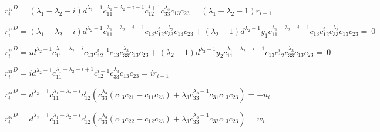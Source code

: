 %
%
$ r_i^{_{12}D} = (\lambda_1 - \lambda_2 - i) d^{\lambda_2 - 1} c_{11}^{\lambda_1 - \lambda_2 - i - 1} c_{12}^{i + 1} c_{33}^{\lambda_3} c_{13}c_{23} = (\lambda_1 - \lambda_2 - 1) r_{i + 1} $
\newline

%
%
$ r_i^{_{13}D} = (\lambda_1 - \lambda_2 - i) d^{\lambda_2 - 1} c_{11}^{\lambda_1 - \lambda_2 - i - 1} c_{13} c_{12}^i c_{33}^{\lambda_3} c_{13}c_{23} + (\lambda_2 - 1) d^{\lambda_2 - 1} y_1 c_{11}^{\lambda_1 - \lambda_2 - i - 1} c_{13} c_{12}^i c_{33}^{\lambda_3} c_{13}c_{23} = ~0 $
\newline

%
%
$ r_i^{_{23}D} = i d^{\lambda_2 - 1} c_{11}^{\lambda_1 - \lambda_2 - i} c_{13} c_{12}^{i - 1} c_{13} c_{33}^{\lambda_3} c_{13}c_{23} + (\lambda_2 - 1) d^{\lambda_2 - 1} y_2 c_{11}^{\lambda_1 - \lambda_2 - i - 1} c_{13} c_{12}^i c_{33}^{\lambda_3} c_{13}c_{23} = ~0 $
\newline

%
%
$ r_i^{_{21}D} = i d^{\lambda_2 - 1} c_{11}^{\lambda_1 - \lambda_2 - i + 1} c_{12}^{i - 1} c_{33}^{\lambda_3} c_{13}c_{23} = i r_{i - 1} $
\newline

%
%
$ r_i^{_{31}D} = d^{\lambda_2 - 1} c_{11}^{\lambda_1 - \lambda_2 - i} c_{12}^i (c_{33}^{\lambda_3} (c_{13}c_{21} - c_{11}c_{23}) + \lambda_3 c_{33}^{\lambda_3 - 1} c_{31}c_{13}c_{23}) = - u_i $
\newline

%
%
$ r_i^{_{32}D} = d^{\lambda_2 - 1} c_{11}^{\lambda_1 - \lambda_2 - i} c_{12}^i (c_{33}^{\lambda_3} (c_{13}c_{22} - c_{12}c_{23}) + \lambda_3 c_{33}^{\lambda_3 - 1} c_{32}c_{13}c_{23}) = w_i $
